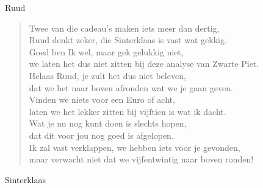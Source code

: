 \documentclass[12pt]{brief}
\begin{document}
\begin{letter}{Ruud}
\begin{verse}
Twee van die cadeau's maken iets meer dan dertig,\\
Ruud denkt zeker, die Sinterklaas is vast wat gekkig.\\
Goed ben Ik wel, maar gek gelukkig niet,\\
we laten het dus niet zitten bij deze analyse van Zwarte Piet.\\[0.5em]

Helaas Ruud, je zult het dus niet beleven,\\
dat we het naar boven afronden wat we je gaan geven.\\
Vinden we niets voor een Euro of acht,\\
laten we het lekker zitten bij vijftien is wat ik dacht.\\[0.5em]

Wat je nu nog kunt doen is slechts hopen,\\
dat dit voor jou nog goed is afgelopen.\\
Ik zal vast verklappen, we hebben iets voor je gevonden,\\
maar verwacht niet dat we vijfentwintig naar boven ronden!\\[2em]

\end{verse}


Sinterklaas


\closing{}

\end{letter}
\end{document}
